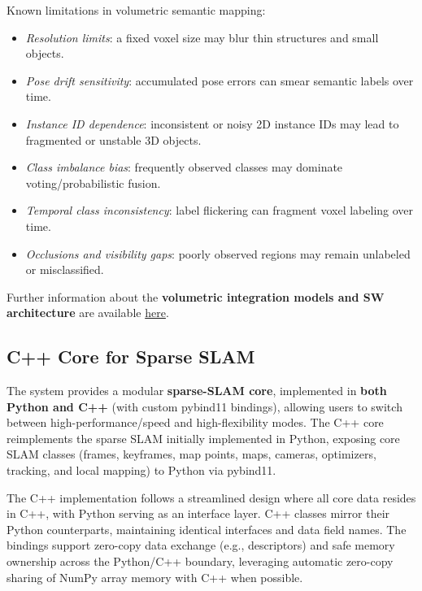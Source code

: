\documentclass{article}
\begin{document}
Known limitations in volumetric semantic mapping:
\begin{itemize}
\item \textit{Resolution limits}: a fixed voxel size may blur thin structures and small objects.
\item \textit{Pose drift sensitivity}: accumulated pose errors can smear semantic labels over time.
\item \textit{Instance ID dependence}: inconsistent or noisy 2D instance IDs may lead to fragmented or unstable 3D objects.
\item \textit{Class imbalance bias}: frequently observed classes may dominate voting/probabilistic fusion.
\item \textit{Temporal class inconsistency}: label flickering can fragment voxel labeling over time.
\item \textit{Occlusions and visibility gaps}: poorly observed regions may remain unlabeled or misclassified.
\end{itemize}

Further information about the \textbf{volumetric integration models and
SW architecture} are available \href{https://github.com/luigifreda/pyslam/blob/mastercpp/volumetric/README.md}{here}.


\hypertarget{cpp-core}{%
\subsection{C++ Core for Sparse SLAM}\label{cpp-core}}

The system provides a modular \textbf{sparse-SLAM core}, implemented in \textbf{both Python and C++} (with custom pybind11 bindings), allowing users to switch between high-performance/speed and high-flexibility modes. The C++ core reimplements the sparse SLAM initially implemented in Python, exposing core SLAM classes (frames, keyframes, map points, maps, cameras, optimizers, tracking, and local mapping) to Python via pybind11.

The C++ implementation follows a streamlined design where all core data resides in C++, with Python serving as an interface layer. C++ classes mirror their Python counterparts, maintaining identical interfaces and data field names. The bindings support zero-copy data exchange (e.g., descriptors) and safe memory ownership across the Python/C++ boundary, leveraging automatic zero-copy sharing of NumPy array memory with C++ when possible.
\end{document}
